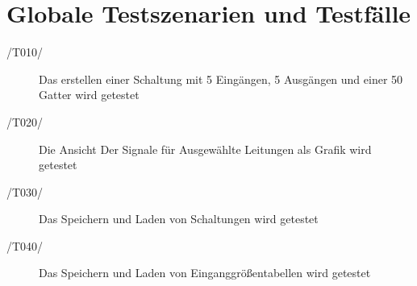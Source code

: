 
\section{Globale Testszenarien und Testfälle}


\begin{description}
	\item[/T010/] Das erstellen einer Schaltung mit 5 Eingängen, 5 Ausgängen und einer 50 Gatter wird getestet
	\item[/T020/] Die Ansicht Der Signale für Ausgewählte Leitungen als Grafik wird getestet
	\item[/T030/] Das Speichern und Laden von Schaltungen wird getestet
	\item[/T040/] Das Speichern und Laden von Einganggrößentabellen wird getestet
\end{description}